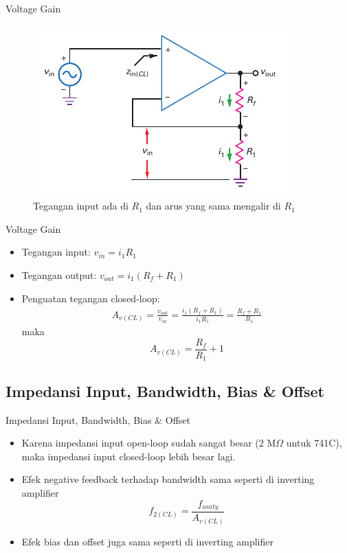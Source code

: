 \begin{frame}{Voltage Gain}
	\begin{figure}
		\centering
		\includegraphics[width=\linewidth]{gambar/fig-16.20}
		\caption{Tegangan input ada di $ R_1 $ dan arus yang sama mengalir di $ R_1 $}
		\label{fig-16.20}
	\end{figure}
\end{frame}

\begin{frame}{Voltage Gain}
	\begin{itemize}
		\item Tegangan input: $ v_{in} = i_1 R_1 $
		\item Tegangan output: $ v_{out} = i_1 (R_f + R_1) $
		\item Penguatan tegangan closed-loop:
		\begin{align*}
			A_{v(CL)} = \frac{v_{out}}{v_{in}} = \frac{i_1 (R_f + R_1)}{i_1 R_1} = \frac{R_f + R_1}{R_1}
		\end{align*}
		maka
		\begin{equation}\label{pers.16.12}
			A_{v(CL)} = \frac{R_f}{R_1} + 1
		\end{equation}
	\end{itemize}
\end{frame}

\subsection{Impedansi Input, Bandwidth, Bias \& Offset}
\begin{frame}{Impedansi Input, Bandwidth, Bias \& Offset}
	\begin{itemize}
		\item Karena impedansi input open-loop sudah sangat besar (2 M$ \Omega $ untuk 741C), maka impedansi input closed-loop lebih besar lagi.
		\item Efek negative feedback terhadap bandwidth sama seperti di inverting amplifier
		\[ f_{2(CL)} = \frac{f_{unity}}{A_{v(CL)}} \]
		\item Efek bias dan offset juga sama seperti di inverting amplifier
	\end{itemize}
\end{frame}

